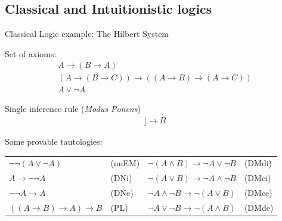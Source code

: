 \documentclass[aspectratio=169, 12pt, fleqn]{beamer}
\begin{document}
\subsection{Classical and Intuitionistic logics}

\begin{frame}{Classical Logic}
{example: The Hilbert System}

\vspace{10pt}
\textcolor{dkblue}{Set of axioms:}
\vspace{-10pt}
\begin{gather}
A \rightarrow (B \rightarrow A)
\tag{A1} \\
(A \rightarrow (B \rightarrow C)) \rightarrow ((A \rightarrow B) \rightarrow (A \rightarrow C))
\tag{A2} \\
A \lor \neg A
\tag{EM} 
\end{gather}

\textcolor{dkblue}{Single inference rule (\textit{Modus Ponens})}
\vspace{-10pt}
\begin{gather} 
[\![ A, A \rightarrow B ]\!] \longrightarrow B
\tag{MP}
\end{gather}

\textcolor{dkblue}{Some provable tautologies:}
\begin{tabular}{p{.32\linewidth}p{.17\linewidth} p{.32\linewidth}p{.18\linewidth}}
$\neg \neg (A \lor \neg A)$ & (nnEM) & $\neg (A \land B) \rightarrow \neg A \lor \neg B $ & (DMdi) \\
$A \rightarrow \neg \neg A$ & (DNi)  & $\neg (A \lor B) \rightarrow \neg A \land \neg B $ & (DMci) \\
$\neg \neg A \rightarrow A$ & (DNe)  & $\neg A \land \neg B \rightarrow  \neg (A \lor B) $ & (DMce) \\
$((A \rightarrow B) \rightarrow A) \rightarrow B$ & (PL) & $\neg A \lor \neg B \rightarrow  \neg (A \land B) $ & (DMde)
\end{tabular}

\end{frame}
\end{document}
